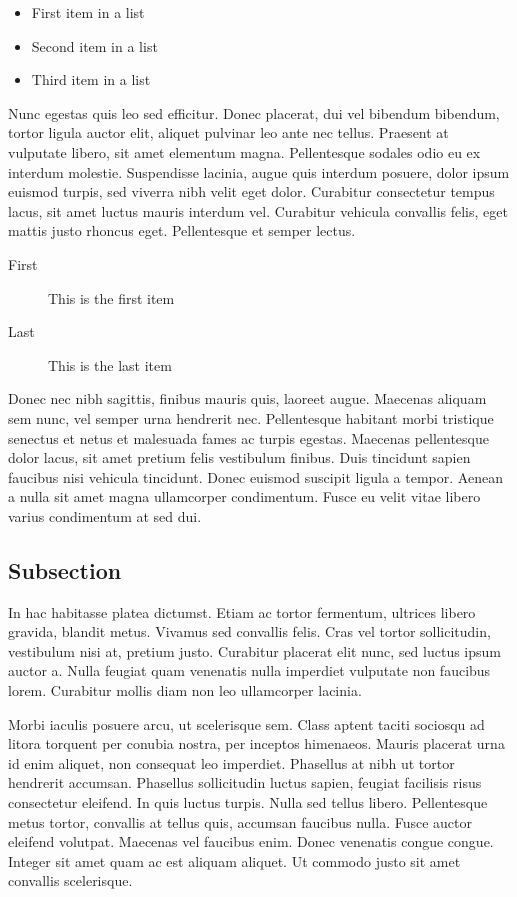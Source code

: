 \documentclass[10pt, a4paper, twocolumn]{article}
\begin{document}
\begin{itemize}
	\item First item in a list
	\item Second item in a list
	\item Third item in a list
\end{itemize}

Nunc egestas quis leo sed efficitur. Donec placerat, dui vel bibendum bibendum,
tortor ligula auctor elit, aliquet pulvinar leo ante nec tellus. Praesent at
vulputate libero, sit amet elementum magna. Pellentesque sodales odio eu ex
interdum molestie. Suspendisse lacinia, augue quis interdum posuere, dolor
ipsum euismod turpis, sed viverra nibh velit eget dolor. Curabitur consectetur
tempus lacus, sit amet luctus mauris interdum vel. Curabitur vehicula convallis
felis, eget mattis justo rhoncus eget. Pellentesque et semper lectus.

\begin{description}
	\item[First] This is the first item
	\item[Last] This is the last item
\end{description}

Donec nec nibh sagittis, finibus mauris quis, laoreet augue. Maecenas aliquam
sem nunc, vel semper urna hendrerit nec. Pellentesque habitant morbi tristique
senectus et netus et malesuada fames ac turpis egestas. Maecenas pellentesque
dolor lacus, sit amet pretium felis vestibulum finibus. Duis tincidunt sapien
faucibus nisi vehicula tincidunt. Donec euismod suscipit ligula a tempor.
Aenean a nulla sit amet magna ullamcorper condimentum. Fusce eu velit vitae
libero varius condimentum at sed dui.


\subsection{Subsection}

In hac habitasse platea dictumst. Etiam ac tortor fermentum, ultrices libero
gravida, blandit metus. Vivamus sed convallis felis. Cras vel tortor
sollicitudin, vestibulum nisi at, pretium justo. Curabitur placerat elit nunc,
sed luctus ipsum auctor a. Nulla feugiat quam venenatis nulla imperdiet
vulputate non faucibus lorem. Curabitur mollis diam non leo ullamcorper
lacinia.

Morbi iaculis posuere arcu, ut scelerisque sem. Class aptent taciti sociosqu ad
litora torquent per conubia nostra, per inceptos himenaeos. Mauris placerat
urna id enim aliquet, non consequat leo imperdiet. Phasellus at nibh ut tortor
hendrerit accumsan. Phasellus sollicitudin luctus sapien, feugiat facilisis
risus consectetur eleifend. In quis luctus turpis. Nulla sed tellus libero.
Pellentesque metus tortor, convallis at tellus quis, accumsan faucibus nulla.
Fusce auctor eleifend volutpat. Maecenas vel faucibus enim. Donec venenatis
congue congue. Integer sit amet quam ac est aliquam aliquet. Ut commodo justo
sit amet convallis scelerisque.
\end{document}
